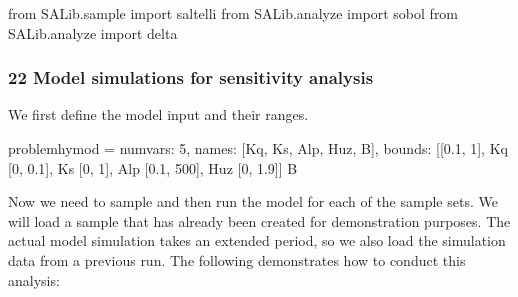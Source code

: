 \documentclass[letterpaper,10pt,english]{book}
\begin{document}
\begin{sphinxVerbatim}[commandchars=\\\{\}]
from SALib.sample import saltelli
from SALib.analyze import sobol
from SALib.analyze import delta
\end{sphinxVerbatim}


\subsubsection{2\sphinxhyphen{}2 Model simulations for sensitivity analysis}
\label{\detokenize{A2_Jupyter_Notebooks:model-simulations-for-sensitivity-analysis}}
\sphinxAtStartPar
We first define the model input and their ranges.

\begin{sphinxVerbatim}[commandchars=\\\{\}]
problem\PYGZus{}hymod = \PYGZob{}
    \PYGZsq{}num\PYGZus{}vars\PYGZsq{}: 5,
    \PYGZsq{}names\PYGZsq{}: [\PYGZsq{}Kq\PYGZsq{}, \PYGZsq{}Ks\PYGZsq{}, \PYGZsq{}Alp\PYGZsq{}, \PYGZsq{}Huz\PYGZsq{}, \PYGZsq{}B\PYGZsq{}],
    \PYGZsq{}bounds\PYGZsq{}: [[0.1, 1],  \PYGZsh{} Kq
               [0, 0.1],  \PYGZsh{} Ks
               [0, 1],    \PYGZsh{} Alp
               [0.1, 500],  \PYGZsh{} Huz
               [0, 1.9]]  \PYGZsh{} B
\PYGZcb{}
\end{sphinxVerbatim}

\sphinxAtStartPar
Now we need to sample and then run the model for each of the sample
sets. We will load a sample that has already been created
 for demonstration purposes. The actual model
simulation takes an extended period, so we also load the simulation data
from a previous run. The following demonstrates how to conduct this
analysis:
\end{document}
